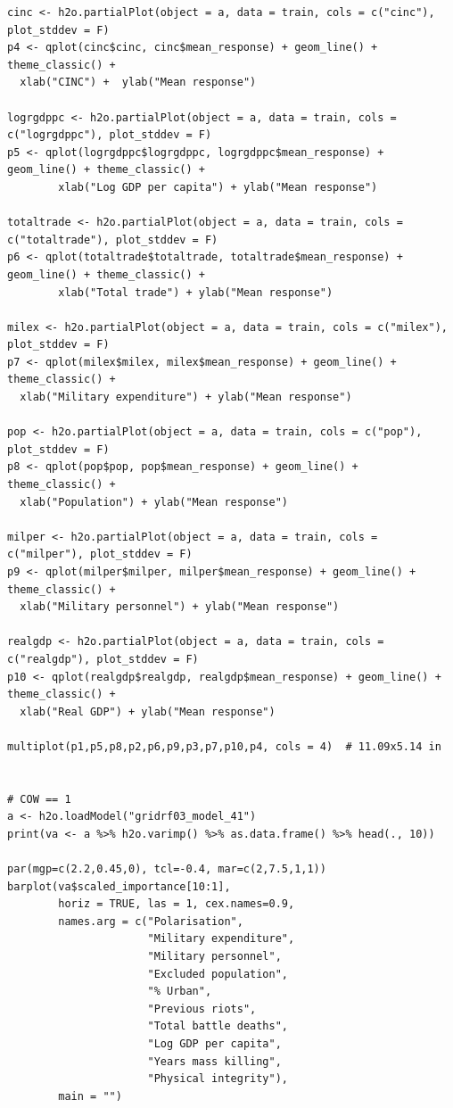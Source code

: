 \documentclass[a4paper,12pt]{article}
\begin{document}
\begin{verbatim}
cinc <- h2o.partialPlot(object = a, data = train, cols = c("cinc"), plot_stddev = F)
p4 <- qplot(cinc$cinc, cinc$mean_response) + geom_line() + theme_classic() + 
  xlab("CINC") +  ylab("Mean response")

logrgdppc <- h2o.partialPlot(object = a, data = train, cols = c("logrgdppc"), plot_stddev = F)
p5 <- qplot(logrgdppc$logrgdppc, logrgdppc$mean_response) + geom_line() + theme_classic() +
        xlab("Log GDP per capita") + ylab("Mean response")

totaltrade <- h2o.partialPlot(object = a, data = train, cols = c("totaltrade"), plot_stddev = F)
p6 <- qplot(totaltrade$totaltrade, totaltrade$mean_response) + geom_line() + theme_classic() +
        xlab("Total trade") + ylab("Mean response")

milex <- h2o.partialPlot(object = a, data = train, cols = c("milex"), plot_stddev = F)
p7 <- qplot(milex$milex, milex$mean_response) + geom_line() + theme_classic() +
  xlab("Military expenditure") + ylab("Mean response")

pop <- h2o.partialPlot(object = a, data = train, cols = c("pop"), plot_stddev = F)
p8 <- qplot(pop$pop, pop$mean_response) + geom_line() + theme_classic() +
  xlab("Population") + ylab("Mean response")

milper <- h2o.partialPlot(object = a, data = train, cols = c("milper"), plot_stddev = F)
p9 <- qplot(milper$milper, milper$mean_response) + geom_line() + theme_classic() +
  xlab("Military personnel") + ylab("Mean response")

realgdp <- h2o.partialPlot(object = a, data = train, cols = c("realgdp"), plot_stddev = F)
p10 <- qplot(realgdp$realgdp, realgdp$mean_response) + geom_line() + theme_classic() +
  xlab("Real GDP") + ylab("Mean response")

multiplot(p1,p5,p8,p2,p6,p9,p3,p7,p10,p4, cols = 4)  # 11.09x5.14 in


# COW == 1
a <- h2o.loadModel("gridrf03_model_41")
print(va <- a %>% h2o.varimp() %>% as.data.frame() %>% head(., 10)) 

par(mgp=c(2.2,0.45,0), tcl=-0.4, mar=c(2,7.5,1,1))
barplot(va$scaled_importance[10:1],
        horiz = TRUE, las = 1, cex.names=0.9,
        names.arg = c("Polarisation",
                      "Military expenditure",
                      "Military personnel",
                      "Excluded population", 
                      "% Urban",
                      "Previous riots",
                      "Total battle deaths", 
                      "Log GDP per capita",
                      "Years mass killing",
                      "Physical integrity"),
        main = "")


\end{verbatim}
\end{document}
